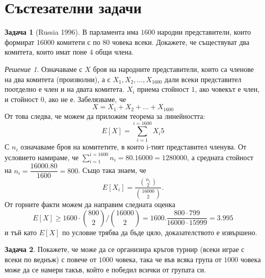\documentclass[11 pt, a4paper]{article}
\theoremstyle{definition}
\newtheorem{p}{Задача}
\theoremstyle{remark}
\newtheorem*{s}{Решение}
\begin{document}
\section{Състезателни задачи}
\begin{p}[Russia 1996]

В парламента има $1600$ народни представители, които формират $16000$ комитети с по $80$ човека всеки. Докажете, че съществуват два комитета, които имат поне $4$ общи члена.\par
\end{p}
\begin{s}
Означаваме с $X$ броя на народните представители, които са членове на два комитета (произволни), а с $X_1, X_2,\dots,X_{1600}$ дали всеки представител поотделно е член и на двата комитета. $X_i$ приема стойност $1$, ако човекът е член, и стойност  $0$, ако не е. Забелязваме, че
\begin{equation*}
X=X_1+X_2+\dots+X_{1600}
\end{equation*}
От това следва, че можем да приложим теорема за линейността:
\begin{equation*}
E[X]=\sum_{i=1}^{i=1600} X_i5
\end{equation*}
С $n_i$ означаваме броя на комитетите, в които i-тият представител членува. От условието намираме, че $\sum_{i=1}^{i=1600}n_i=80.16000=1280000$, а средната стойност на $n_i=\dfrac{16000.80}{1600}=800$. Също така знаем, че
\begin{equation*}
E[X_i]=\dfrac{{{n_i}\choose{2}}}{{{16000}\choose{2}}}.
\end{equation*}
От горните факти можем да направим следната оценка
\begin{equation*}
E[X]\geq1600\cdot{800\choose{2}}/{16000\choose{2}}=1600.\dfrac{800\cdot799}{16000\cdot15999}=3.995
\end{equation*}
и тъй като ${E[X]}$ по условие трябва да бъде цяло, доказателството е извършено.
\end{s}
\begin{p}
Покажете, че може да се организира кръгов турнир (всеки играе с всеки по веднъж) с повече от $1000$ човека, така че във всяка група от $1000$ човека може да се намери такъв, който е победил всички от групата си.\par
\end{p}
\end{document}
